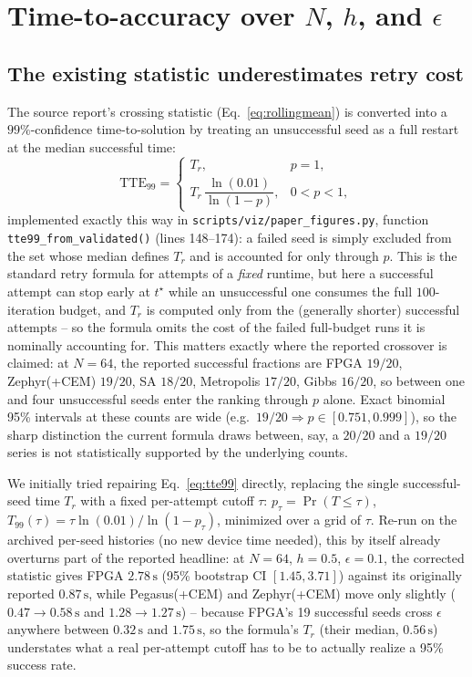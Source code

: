 \section{Time-to-accuracy over $N$, $h$, and $\epsilon$}
\label{sec:tta}

\subsection{The existing statistic underestimates retry cost}
\label{sec:tte-issue}

The source report's crossing statistic (Eq.~\eqref{eq:rollingmean}) is converted into a $99\%$-confidence time-to-solution by treating an unsuccessful seed as a full restart at the median successful time:
\begin{equation}
\mathrm{TTE}_{99}=
\begin{cases}
T_r, & p=1,\\[2pt]
T_r\,\dfrac{\ln(0.01)}{\ln(1-p)}, & 0<p<1,
\end{cases}
\label{eq:tte99}
\end{equation}
implemented exactly this way in \texttt{scripts/viz/paper\_figures.py}, function \texttt{tte99\_from\_validated()} (lines 148--174): a failed seed is simply excluded from the set whose median defines $T_r$ and is accounted for only through $p$. This is the standard retry formula for attempts of a \emph{fixed} runtime, but here a successful attempt can stop early at $t^\star$ while an unsuccessful one consumes the full $100$-iteration budget, and $T_r$ is computed only from the (generally shorter) successful attempts -- so the formula omits the cost of the failed full-budget runs it is nominally accounting for. This matters exactly where the reported crossover is claimed: at $N=64$, the reported successful fractions are FPGA $19/20$, Zephyr(+CEM) $19/20$, SA $18/20$, Metropolis $17/20$, Gibbs $16/20$, so between one and four unsuccessful seeds enter the ranking through $p$ alone. Exact binomial 95\% intervals at these counts are wide (e.g.\ $19/20\Rightarrow p\in[0.751,0.999]$), so the sharp distinction the current formula draws between, say, a $20/20$ and a $19/20$ series is not statistically supported by the underlying counts.

We initially tried repairing Eq.~\eqref{eq:tte99} directly, replacing the single successful-seed time $T_r$ with a fixed per-attempt cutoff $\tau$: $p_\tau=\Pr(T\le\tau)$, $T_{99}(\tau)=\tau\ln(0.01)/\ln(1-p_\tau)$, minimized over a grid of $\tau$. Re-run on the archived per-seed histories (no new device time needed), this by itself already overturns part of the reported headline: at $N=64$, $h=0.5$, $\epsilon=0.1$, the corrected statistic gives FPGA $2.78\,\mathrm s$ (95\% bootstrap CI $[1.45,3.71]$) against its originally reported $0.87\,\mathrm s$, while Pegasus(+CEM) and Zephyr(+CEM) move only slightly ($0.47\to0.58\,\mathrm s$ and $1.28\to1.27\,\mathrm s$) -- because FPGA's 19 successful seeds cross $\epsilon$ anywhere between $0.32\,\mathrm s$ and $1.75\,\mathrm s$, so the formula's $T_r$ (their median, $0.56\,\mathrm s$) understates what a real per-attempt cutoff has to be to actually realize a 95\% success rate.

